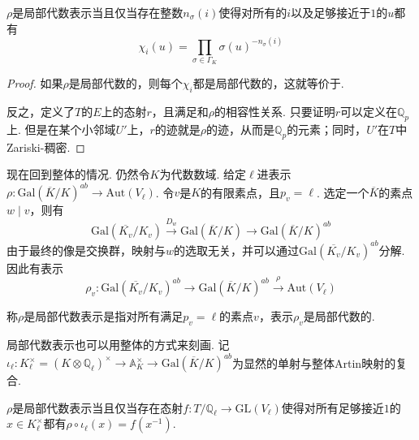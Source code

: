 \begin{cprop}
    $\rho$是局部代数表示当且仅当存在整数$n_{\sigma}(i)$使得对所有的$i$以及足够接近于$1$的$u$都有
    \begin{equation}
        \chi_i(u) = \prod_{\sigma\in \Gamma_K} \sigma(u)^{-n_{\sigma}(i)} \label{eqns::temp::1}
    \end{equation}
\end{cprop}

\begin{proof}
    如果$\rho$是局部代数的，则每个$\chi_i$都是局部代数的，这就等价于.

    反之，定义了$T$的$E$上的态射$r$，且满足和$\rho$的相容性关系. 只要证明$r$可以定义在$\mathbb{Q}_p$上. 但是在某个小邻域$U'$上，$r$的迹就是$\rho$的迹，从而是$\mathbb{Q}_p$的元素；同时，$U'$在$T$中Zariski-稠密.
\end{proof}

现在回到整体的情况. 仍然令$K$为代数数域. 给定$\ell$进表示$\rho: \mathrm{Gal}(\overline{K}/K)^{ab}\to \mathrm{Aut}(V_{\ell})$. 令$v$是$K$的有限素点，且$p_v = \ell$. 选定一个$\overline{K}$的素点$w\mid v$，则有
\begin{equation}
    \mathrm{Gal}(\overline{K_v}/K_v) \xrightarrow{D_{w}} \mathrm{Gal}(\overline{K}/K) \to \mathrm{Gal}(\overline{K}/K)^{ab}
\end{equation}
由于最终的像是交换群，映射与$w$的选取无关，并可以通过$\mathrm{Gal}(\overline{K_v}/K_v)^{ab}$分解. 因此有表示
\begin{equation}
    \rho_v: \mathrm{Gal}(\overline{K_v}/K_v)^{ab} \to \mathrm{Gal}(\overline{K}/K)^{ab} \xrightarrow{\rho} \mathrm{Aut}(V_{\ell})
\end{equation}

\begin{cdef}
    称$\rho$是局部代数表示是指对所有满足$p_v=\ell$的素点$v$，表示$\rho_v$是局部代数的.
\end{cdef}

局部代数表示也可以用整体的方式来刻画. 记$\iota_{\ell}: K_{\ell}^{\times}=(K\otimes \mathbb{Q}_{\ell})^{\times} \to \mathbb{A}_{K}^{\times} \to \mathrm{Gal}(\overline{K}/K)^{ab}$为显然的单射与整体Artin映射的复合.

\begin{cprop}
    $\rho$是局部代数表示当且仅当存在态射$f: T/\mathbb{Q}_{\ell} \to \mathrm{GL}(V_{\ell})$使得对所有足够接近$1$的$x\in K_{\ell}^{\times}$都有$\rho\circ \iota_{\ell}(x) = f(x^{-1})$.
\end{cprop}


